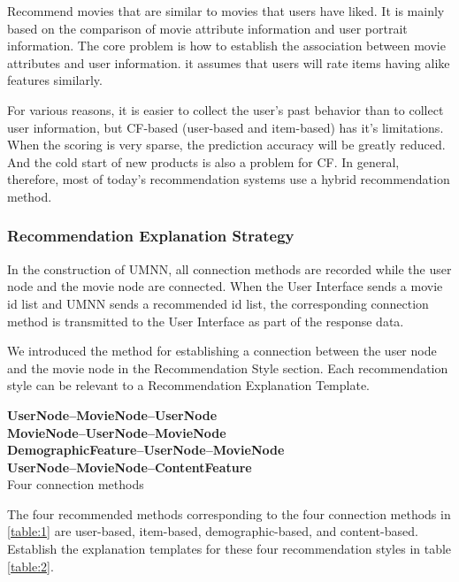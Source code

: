 \begin{itemize}
\par Recommend movies that are similar to movies that users have liked. It is mainly based on the comparison of movie attribute information and user portrait information. The core problem is how to establish the association between movie attributes and user information. it assumes that users will rate items having alike features similarly\cite{safoury2013exploiting}.

\end{itemize}

\par For various reasons, it is easier to collect the user's past behavior than to collect user information, but CF-based (user-based and item-based) has it's limitations. When the scoring is very sparse, the prediction accuracy will be greatly reduced. And the cold start of new products is also a problem for CF. In general, therefore, most of today's recommendation systems use a hybrid recommendation method.
\subsubsection{Recommendation Explanation Strategy}
In the construction of UMNN, all connection methods are recorded while the user node and the movie node are connected. When the User Interface sends a movie id list and UMNN sends a recommended id list, the corresponding connection method is transmitted to the User Interface as part of the response data.
\par We introduced the method for establishing a connection between the user node and the movie node in the Recommendation Style section. Each recommendation style can be relevant to a Recommendation Explanation Template.
\\
\begin{table}[h!]
\centering

\textbf{UserNode--MovieNode--UserNode}\\
\textbf{MovieNode--UserNode--MovieNode}\\
\textbf{DemographicFeature--UserNode--MovieNode}\\
\textbf{UserNode--MovieNode--ContentFeature}\\

\caption{Four connection methods}
\label{table:1}
\end{table}
The four recommended methods corresponding to the four connection methods in \ref{table:1} are user-based, item-based, demographic-based, and content-based. Establish the explanation templates for these four recommendation styles in table \ref{table:2}.

